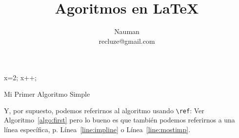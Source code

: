 \documentclass{article}
\begin{document}
\title{Agoritmos en \LaTeX}
\author{Nauman \\ recluze@gmail.com}
\maketitle



\begin{algorithm}
\begin{algorithmic}

\STATE x=2;
   \STATE x++;
\ELSE
   \RETURN 
\ENDIF
\end{algorithmic}
\caption{Mi Primer Algoritmo Simple}
\label{algo:first}
\end{algorithm}

Y, por supuesto, podemos referirnos al algoritmo usando \verb|\ref|: Ver Algoritmo~\ref{algo:first} pero lo bueno es que también podemos referirnos a una línea específica, p. Línea~\ref{line:impline} o Línea~\ref{line:mostimp}.
\end{document}
